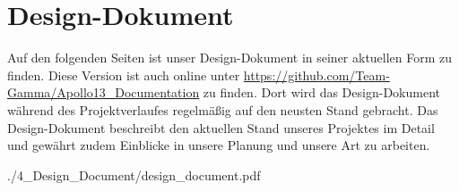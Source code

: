 \documentclass{article}
\begin{document}






\newpage

\section{Design-Dokument}
Auf den folgenden Seiten ist unser Design-Dokument in seiner aktuellen Form zu finden. Diese Version ist auch online unter \url{https://github.com/Team-Gamma/Apollo13_Documentation} zu finden. Dort wird das Design-Dokument während des Projektverlaufes regelmäßig auf den neusten Stand gebracht. Das Design-Dokument beschreibt den aktuellen Stand unseres Projektes im Detail und gewährt zudem Einblicke in unsere Planung und unsere Art zu arbeiten.

{./4_Design_Document/design_document.pdf}
\end{document}
